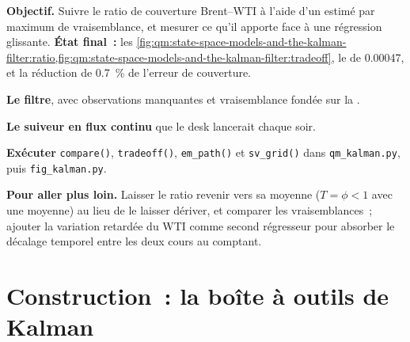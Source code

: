 \begin{tutorial}
\textbf{Objectif.} Suivre le ratio de couverture Brent--WTI à l'aide d'un  estimé par maximum de vraisemblance, et mesurer ce qu'il apporte face à une régression glissante.
\textbf{État final~:} les \cref{fig:qm:state-space-models-and-the-kalman-filter:ratio,fig:qm:state-space-models-and-the-kalman-filter:tradeoff}, le 
de 0.00047, et la réduction de 0.7~\% de l'erreur de couverture.
\begin{tutsteps}
\item \textbf{Le filtre}, avec observations manquantes et vraisemblance fondée sur la .
\label{lst:qm:state-space-models-and-the-kalman-filter:kf}
\item \textbf{Le suiveur en flux continu} que le desk lancerait chaque soir.
\label{lst:qm:state-space-models-and-the-kalman-filter:tracker}
\item \textbf{Exécuter} \texttt{compare()}, \texttt{tradeoff()}, \texttt{em\_path()} et \texttt{sv\_grid()} dans \texttt{qm\_kalman.py}, puis \texttt{fig\_kalman.py}.
\end{tutsteps}
\textbf{Pour aller plus loin.} Laisser le ratio revenir vers sa moyenne ($T = \phi < 1$ avec une moyenne) au lieu de le laisser dériver, et comparer les vraisemblances~; ajouter la variation retardée du WTI comme
second régresseur pour absorber le décalage temporel entre les deux cours au comptant.
\end{tutorial}

\section{Construction~: la boîte à outils de Kalman}\label{bld:qm:state-space-models-and-the-kalman-filter:kalman}

